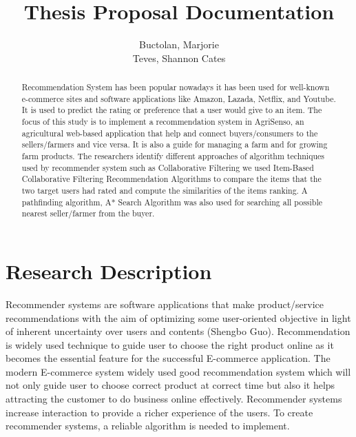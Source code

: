 \documentclass{report}
\begin{document}
\title{\textbf{Thesis Proposal Documentation} \\ 
}
\author{
\normalsize
Buctolan, Marjorie \\
Teves, Shannon Cates \\
}


\maketitle
\tableofcontents
\newpage
{}

\begin{abstract}
Recommendation System has been popular nowadays it has been used for well-known
e-commerce sites and software applications like Amazon, Lazada, Netflix, and Youtube. It is
used to predict the rating or preference that a user would give to an item. The focus of this
study is to implement a recommendation system in AgriSenso, an agricultural web-based
application that help and connect buyers/consumers to the sellers/farmers and vice versa. It is
also a guide for managing a farm and for growing farm products. The researchers identify
different approaches of algorithm techniques used by recommender system such as
Collaborative Filtering we used Item-Based Collaborative Filtering Recommendation Algorithms
to compare the items that the two target users had rated and compute the similarities of the
items ranking. A pathfinding algorithm, A* Search Algorithm was also used for searching all
possible nearest seller/farmer from the buyer.
\end{abstract}

\chapter{Research Description}
\label{chpt: Research Description}
Recommender systems are software applications that make product/service recommendations
with the aim of optimizing some user-oriented objective in light of inherent uncertainty over
users and contents (Shengbo Guo). Recommendation is widely used technique to guide user to
choose the right product online as it becomes the essential feature for the successful
E-commerce application. The modern E-commerce system widely used good recommendation
system which will not only guide user to choose correct product at correct time but also it helps
attracting the customer to do business online effectively. Recommender systems increase
interaction to provide a richer experience of the users. To create recommender systems, a
reliable algorithm is needed to implement.
\end{document}
